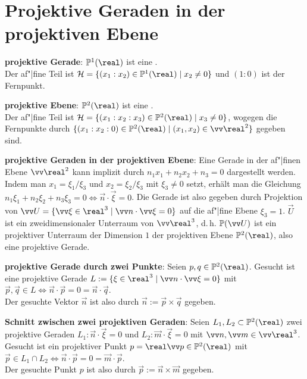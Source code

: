\pagebreak

\section{%
    Projektive Geraden in der projektiven Ebene%
}

\textbf{projektive Gerade}:
$\PP^1(\real)$ ist eine .\\
Der af"|fine Teil ist $\H = \{(x_1 : x_2) \in \PP^1(\real) \;|\; x_2 \not= 0\}$
und $(1 : 0)$ ist der Fernpunkt.

\textbf{projektive Ebene}:
$\PP^2(\real)$ ist eine .\\
Der af"|fine Teil ist $\H = \{(x_1 : x_2 : x_3) \in \PP^2(\real) \;|\; x_3 \not= 0\}$,
wogegen die Fernpunkte durch $\{(x_1 : x_2 : 0) \in \PP^2(\real) \;|\;
(x_1, x_2) \in \vec{\real}^2\}$ gegeben sind.

\linie

\textbf{projektive Geraden in der projektiven Ebene}:
Eine Gerade in der af"|finen Ebene $\vec{\real}^2$ kann implizit durch
$n_1x_1 + n_2x_2 + n_3 = 0$ dargestellt werden.
Indem man $x_1 = \xi_1/\xi_3$ und $x_2 = \xi_2/\xi_3$ mit $\xi_3 \not= 0$ setzt,
erhält man die Gleichung $n_1 \xi_1 + n_2 \xi_2 + n_3 \xi_3 = 0 \iff \vec{n} \cdot \vec{\xi} = 0$.
Die Gerade ist also gegeben durch Projektion von
$\vec{U} = \{\vec{\xi} \in \real^3 \;|\; \vec{n} \cdot \vec{\xi} = 0\}$
auf die af"|fine Ebene $\xi_3 = 1$.
$\vec{U}$ ist ein zweidimensionaler Unterraum von $\vec{\real}^3$, d.\,h.
$\PP(\vec{U})$ ist ein projektiver Unterraum der Dimension $1$
der projektiven Ebene $\PP^2(\real)$, also eine projektive Gerade.

\linie

\textbf{projektive Gerade durch zwei Punkte}:
Seien $p, q \in \PP^2(\real)$.
Gesucht ist eine projektive Gerade $L := \{\xi \in \real^3 \;|\; \vec{n} \cdot \vec{\xi} = 0\}$
mit $\vec{p}, \vec{q} \in L \iff \vec{n} \cdot \vec{p} = 0 = \vec{n} \cdot \vec{q}$.\\
Der gesuchte Vektor $\vec{n}$ ist also durch $\vec{n} := \vec{p} \times \vec{q}$ gegeben.

\textbf{Schnitt zwischen zwei projektiven Geraden}:
Seien $L_1, L_2 \subset \PP^2(\real)$ zwei projektive Geraden
$L_1\colon \vec{n} \cdot \vec{\xi} = 0$ und $L_2\colon \vec{m} \cdot \vec{\xi} = 0$ mit
$\vec{n}, \vec{m} \in \vec{\real}^3$.
Gesucht ist ein projektiver Punkt $p = \real\vec{p} \in \PP^2(\real)$ mit $\vec{p} \in L_1 \cap L_2
\iff \vec{n} \cdot \vec{p} = 0 = \vec{m} \cdot \vec{p}$.\\
Der gesuchte Punkt $p$ ist also durch $\vec{p} := \vec{n} \times \vec{m}$ gegeben.

